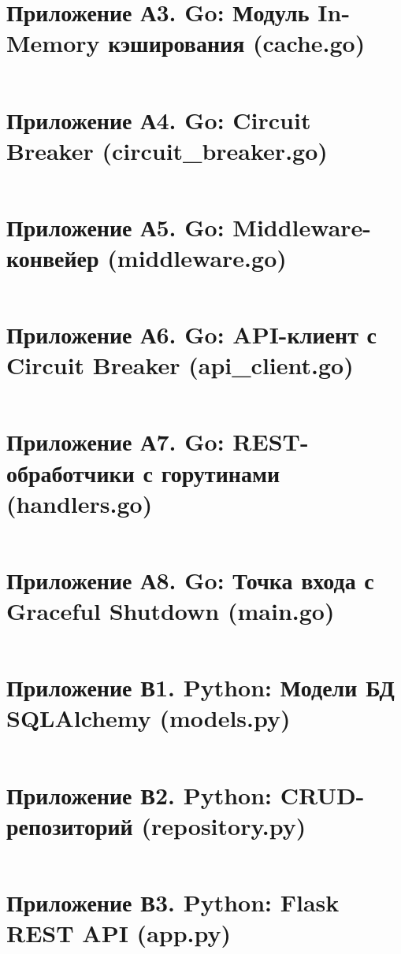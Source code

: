 \documentclass[oneside,a4paper,14pt]{extarticle}
\begin{document}
\section*{Приложение А3. Go: Модуль In-Memory кэширования (cache.go)}
\inputminted{go}{code/go/cache.go}

\section*{Приложение А4. Go: Circuit Breaker (circuit\_breaker.go)}
\inputminted{go}{code/go/circuit_breaker.go}

\section*{Приложение А5. Go: Middleware-конвейер (middleware.go)}
\inputminted{go}{code/go/middleware.go}

\section*{Приложение А6. Go: API-клиент с Circuit Breaker (api\_client.go)}
\inputminted{go}{code/go/api_client.go}

\section*{Приложение А7. Go: REST-обработчики с горутинами (handlers.go)}
\inputminted{go}{code/go/handlers.go}

\section*{Приложение А8. Go: Точка входа с Graceful Shutdown (main.go)}
\inputminted{go}{code/go/main.go}

\section*{Приложение В1. Python: Модели БД SQLAlchemy (models.py)}
\inputminted{python}{code/python/models.py}

\section*{Приложение В2. Python: CRUD-репозиторий (repository.py)}
\inputminted{python}{code/python/repository.py}

\section*{Приложение В3. Python: Flask REST API (app.py)}
\inputminted{python}{code/python/app.py}
\end{document}
